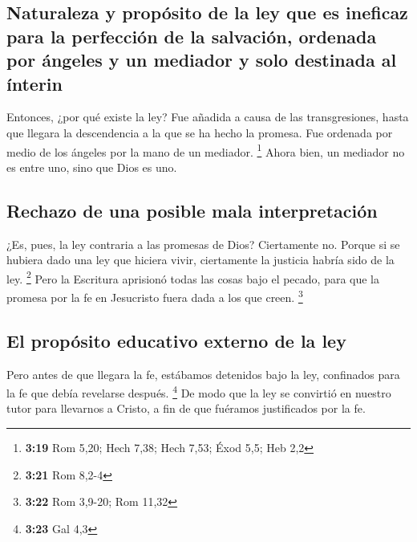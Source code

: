 \begin{paracol}{2}
\hypertarget{naturaleza-y-propuxf3sito-de-la-ley-que-es-ineficaz-para-la-perfecciuxf3n-de-la-salvaciuxf3n-ordenada-por-uxe1ngeles-y-un-mediador-y-solo-destinada-al-uxednterin}{%
\subsection{Naturaleza y propósito de la ley que es ineficaz para la
perfección de la salvación, ordenada por ángeles y un mediador y solo
destinada al
ínterin}\label{naturaleza-y-propuxf3sito-de-la-ley-que-es-ineficaz-para-la-perfecciuxf3n-de-la-salvaciuxf3n-ordenada-por-uxe1ngeles-y-un-mediador-y-solo-destinada-al-uxednterin}}

 Entonces, ¿por qué existe la ley? Fue añadida a causa de
las transgresiones, hasta que llegara la descendencia a la que se ha
hecho la promesa. Fue ordenada por medio de los ángeles por la mano de
un mediador. \footnote{\textbf{3:19} Rom 5,20; Hech 7,38; Hech 7,53;
  Éxod 5,5; Heb 2,2}  Ahora bien, un mediador no es entre
uno, sino que Dios es uno.

\hypertarget{rechazo-de-una-posible-mala-interpretaciuxf3n}{%
\subsection{Rechazo de una posible mala
interpretación}\label{rechazo-de-una-posible-mala-interpretaciuxf3n}}

 ¿Es, pues, la ley contraria a las promesas de Dios?
Ciertamente no. Porque si se hubiera dado una ley que hiciera vivir,
ciertamente la justicia habría sido de la ley. \footnote{\textbf{3:21}
  Rom 8,2-4}  Pero la Escritura aprisionó todas las cosas
bajo el pecado, para que la promesa por la fe en Jesucristo fuera dada a
los que creen. \footnote{\textbf{3:22} Rom 3,9-20; Rom 11,32}

\hypertarget{el-propuxf3sito-educativo-externo-de-la-ley}{%
\subsection{El propósito educativo externo de la
ley}\label{el-propuxf3sito-educativo-externo-de-la-ley}}

 Pero antes de que llegara la fe, estábamos detenidos
bajo la ley, confinados para la fe que debía revelarse después.
\footnote{\textbf{3:23} Gal 4,3}  De modo que la ley se
convirtió en nuestro tutor para llevarnos a Cristo, a fin de que
fuéramos justificados por la fe.


\end{paracol}
